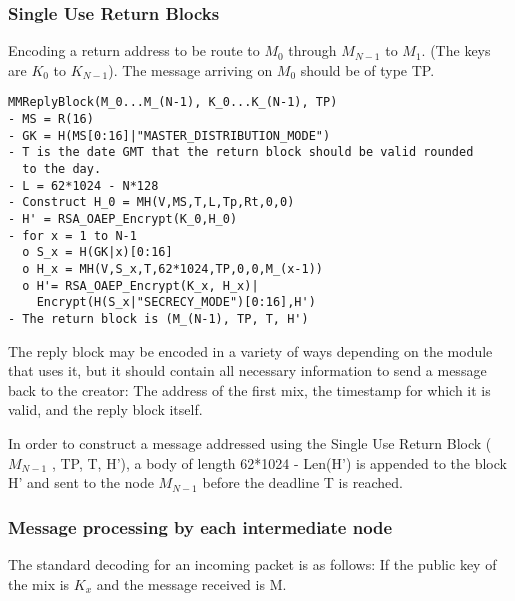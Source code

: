 \documentclass{article}
\begin{document}
\subsubsection{Single Use Return Blocks}

Encoding a return address to be route to $M_0$ through $M_{N-1}$ to
$M_1$. (The keys are $K_0$ to $K_{N-1}$). The message arriving on $M_0$
should be of type TP.

\begin{verbatim}
MMReplyBlock(M_0...M_(N-1), K_0...K_(N-1), TP)
- MS = R(16)
- GK = H(MS[0:16]|"MASTER_DISTRIBUTION_MODE")
- T is the date GMT that the return block should be valid rounded
  to the day. 
- L = 62*1024 - N*128
- Construct H_0 = MH(V,MS,T,L,Tp,Rt,0,0)
- H' = RSA_OAEP_Encrypt(K_0,H_0)
- for x = 1 to N-1
  o S_x = H(GK|x)[0:16]
  o H_x = MH(V,S_x,T,62*1024,TP,0,0,M_(x-1))
  o H'= RSA_OAEP_Encrypt(K_x, H_x)| 
    Encrypt(H(S_x|"SECRECY_MODE")[0:16],H')
- The return block is (M_(N-1), TP, T, H')
\end{verbatim}

The reply block may be encoded in a variety of ways depending on the
module that uses it, but it should contain all necessary information
to send a message back to the creator: The address of the first mix,
the timestamp for which it is valid, and the reply block itself.

In order to construct a message addressed using the Single Use Return
Block ($M_{N-1}$ , TP, T, H'), a body of length 62*1024 - Len(H') is appended
to the block H' and sent to the node $M_{N-1}$ before the deadline T
is reached. 

\subsubsection{Message processing by each intermediate node}

The standard decoding for an incoming packet is as follows:
If the public key of the mix is $K_x$ and the message received is M.
\end{document}
